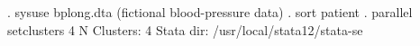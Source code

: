 . sysuse bplong.dta
(fictional blood-pressure data)
{\smallskip}
. sort patient
{\smallskip}
. parallel setclusters 4
N Clusters: 4
Stata dir:  /usr/local/stata12/stata-se
{\smallskip}
